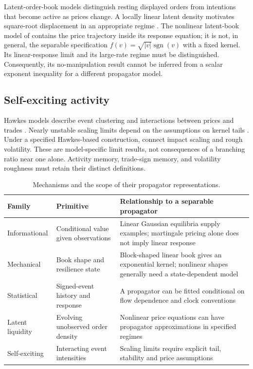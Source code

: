 \documentclass[11pt]{article}
\numberwithin{equation}{section}
\theoremstyle{definition}
\theoremstyle{remark}
\theoremstyle{definition}
\begin{document}
Latent-order-book models distinguish resting displayed orders from intentions
that become active as prices change. A locally linear latent density motivates
square-root displacement in an appropriate regime \citep{toth2011}.
The nonlinear latent-book model of \citet{donier2015} contains the price trajectory
inside its response equation; it is not, in general, the separable specification
$f(v)=\sqrt{|v|}\operatorname{sgn}(v)$ with a fixed kernel. Its linear-response
limit and its large-rate regime must be distinguished. Consequently, its
no-manipulation result cannot be inferred from a scalar exponent inequality for
a different propagator model.

\subsection{Self-exciting activity}

Hawkes models describe event clustering and interactions between prices and trades
\citep{bacrymuzy2014}. Nearly unstable scaling limits depend on the assumptions on
kernel tails \citep{jaissonrosenbaum2015}. Under a specified Hawkes-based
construction, \citet{jusselin2020} connect impact scaling and rough volatility.
These are model-specific limit results, not consequences of a branching ratio
near one alone. Activity memory, trade-sign memory, and volatility roughness
must retain their distinct definitions.

\begin{table}[tb]
\centering\small
\begin{tabularx}{\textwidth}{p{}YY}
\toprule Family & Primitive & Relationship to a separable propagator \\
\midrule
Informational & Conditional value given observations & Linear Gaussian equilibria supply examples; martingale pricing alone does not imply linear response \\
Mechanical & Book shape and resilience state & Block-shaped linear book gives an exponential kernel; nonlinear shapes generally need a state-dependent model \\
Statistical & Signed-event history and response & A propagator can be fitted conditional on flow dependence and clock conventions \\
Latent liquidity & Evolving unobserved order density & Nonlinear price equations can have propagator approximations in specified regimes \\
Self-exciting & Interacting event intensities & Scaling limits require explicit tail, stability and price assumptions \\
\bottomrule
\end{tabularx}
\caption{Mechanisms and the scope of their propagator representations.}
\label{tab:families}
\end{table}
\end{document}
